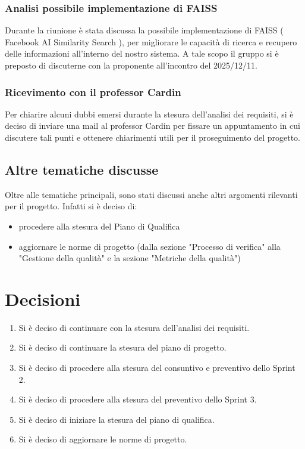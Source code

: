 \documentclass[a4paper,12pt]{article}
\begin{document}
\subsubsection{Analisi possibile implementazione di FAISS}
Durante la riunione è stata discussa la possibile implementazione di FAISS ( Facebook AI Similarity Search ), per migliorare le capacità di ricerca e recupero delle informazioni all'interno del nostro sistema.
A tale scopo il gruppo si è preposto di discuterne con la proponente all'incontro del 2025/12/11.

\subsubsection{Ricevimento con il professor Cardin}Per chiarire alcuni dubbi emersi durante la stesura dell'analisi dei requisiti, si è deciso di inviare una mail 
al professor Cardin per fissare un appuntamento in cui discutere tali punti e ottenere chiarimenti utili per il proseguimento del progetto.

\subsection{Altre tematiche discusse}
Oltre alle tematiche principali, sono stati discussi anche altri argomenti rilevanti per il progetto. Infatti si è deciso di:
\begin{itemize}
    \item procedere alla stesura del Piano di Qualifica
    \item aggiornare le norme di progetto (dalla sezione "Processo di verifica" alla "Gestione della qualità" e la sezione "Metriche della qualità")
\end{itemize}

\section{Decisioni}
\begin{enumerate}[noitemsep]
    \item Si è deciso di continuare con la stesura dell'analisi dei requisiti.
    \item Si è deciso di continuare la stesura del piano di progetto.
    \item Si è deciso di procedere alla stesura del consuntivo e preventivo dello Sprint 2.
    \item Si è deciso di procedere alla stesura del preventivo dello Sprint 3.
    \item Si è deciso di iniziare la stesura del piano di qualifica.
    \item Si è deciso di aggiornare le norme di progetto.
\end{enumerate}
\end{document}
